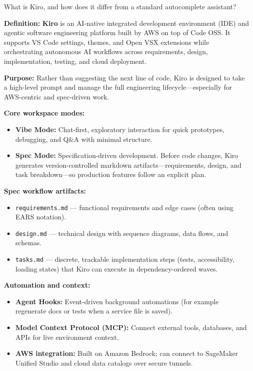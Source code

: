 



\question[6]
What is Kiro, and how does it differ from a standard autocomplete assistant?
\begin{solutionorbox}[4.25in]
\textbf{Definition:} \textbf{Kiro} is an AI-native integrated development environment (IDE) and agentic software engineering platform built by AWS on top of Code OSS. It supports VS Code settings, themes, and Open VSX extensions while orchestrating autonomous AI workflows across requirements, design, implementation, testing, and cloud deployment.

\textbf{Purpose:} Rather than suggesting the next line of code, Kiro is designed to take a high-level prompt and manage the full engineering lifecycle---especially for AWS-centric and spec-driven work.

\textbf{Core workspace modes:}
\begin{itemize}
  \item \textbf{Vibe Mode:} Chat-first, exploratory interaction for quick prototypes, debugging, and Q\&A with minimal structure.
  \item \textbf{Spec Mode:} Specification-driven development. Before code changes, Kiro generates version-controlled markdown artifacts---requirements, design, and task breakdown---so production features follow an explicit plan.
\end{itemize}

\textbf{Spec workflow artifacts:}
\begin{itemize}
  \item \texttt{requirements.md} --- functional requirements and edge cases (often using EARS notation).
  \item \texttt{design.md} --- technical design with sequence diagrams, data flows, and schemas.
  \item \texttt{tasks.md} --- discrete, trackable implementation steps (tests, accessibility, loading states) that Kiro can execute in dependency-ordered waves.
\end{itemize}

\textbf{Automation and context:}
\begin{itemize}
  \item \textbf{Agent Hooks:} Event-driven background automations (for example regenerate docs or tests when a service file is saved).
  \item \textbf{Model Context Protocol (MCP):} Connect external tools, databases, and APIs for live environment context.
  \item \textbf{AWS integration:} Built on Amazon Bedrock; can connect to SageMaker Unified Studio and cloud data catalogs over secure tunnels.
\end{itemize}
\end{solutionorbox}
